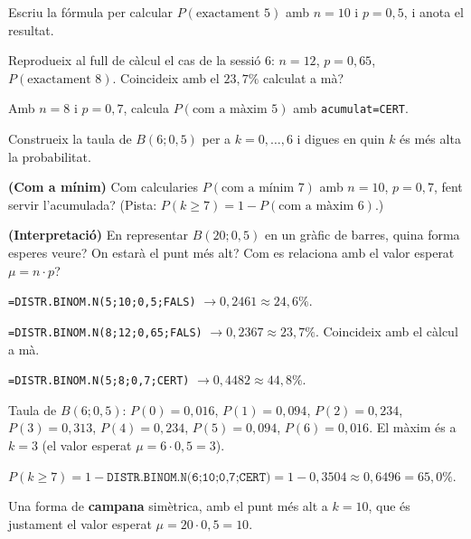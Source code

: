 \begin{exercicis}
\begin{exlist}
  \item Escriu la fórmula per calcular $P(\text{exactament }5)$ amb $n=10$ i $p=0,5$, i
        anota el resultat.
  \item Reprodueix al full de càlcul el cas de la sessió 6: $n=12$, $p=0,65$,
        $P(\text{exactament }8)$. Coincideix amb el $23,7\%$ calculat a mà?
  \item Amb $n=8$ i $p=0,7$, calcula $P(\text{com a màxim }5)$ amb \texttt{acumulat=CERT}.
  \item Construeix la taula de $B(6;0,5)$ per a $k=0,\dots,6$ i digues en quin $k$ és més
        alta la probabilitat.
  \item \textbf{(Com a mínim)} Com calcularies $P(\text{com a mínim }7)$ amb $n=10$,
        $p=0,7$, fent servir l'acumulada? (Pista: $P(k\ge 7)=1-P(\text{com a màxim }6)$.)
  \item \textbf{(Interpretació)} En representar $B(20;0,5)$ en un gràfic de barres, quina
        forma esperes veure? On estarà el punt més alt? Com es relaciona amb el valor
        esperat $\mu=n\cdot p$?
\end{exlist}
\end{exercicis}

\begin{solucions}
\begin{sollist}
  \item \texttt{=DISTR.BINOM.N(5;10;0,5;FALS)} $\to 0,2461\approx 24,6\%$.
  \item \texttt{=DISTR.BINOM.N(8;12;0,65;FALS)} $\to 0,2367\approx 23,7\%$. Coincideix
        amb el càlcul a mà.
  \item \texttt{=DISTR.BINOM.N(5;8;0,7;CERT)} $\to 0,4482\approx 44,8\%$.
  \item Taula de $B(6;0,5)$: $P(0)=0,016$, $P(1)=0,094$, $P(2)=0,234$, $P(3)=0,313$,
        $P(4)=0,234$, $P(5)=0,094$, $P(6)=0,016$. El màxim és a $k=3$ (el valor esperat
        $\mu=6\cdot 0,5=3$).
  \item $P(k\ge 7)=1-\texttt{DISTR.BINOM.N(6;10;0,7;CERT)}=1-0,3504\approx 0,6496=65,0\%$.
  \item Una forma de \textbf{campana} simètrica, amb el punt més alt a $k=10$, que és
        justament el valor esperat $\mu=20\cdot 0,5=10$.
\end{sollist}
\end{solucions}
